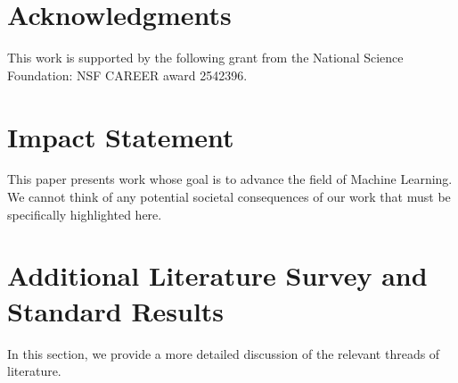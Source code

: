 \documentclass{article}
\begin{document}

\section*{Acknowledgments}
This work is supported by the following grant from the National Science Foundation: NSF CAREER award 2542396. 

\section*{Impact Statement}
This paper presents work whose goal is to advance the field of Machine Learning. We cannot think of any potential societal consequences of our work that must be specifically highlighted here. 


\appendix


\newpage
\onecolumn
\section{Additional Literature Survey and Standard Results}
\label{app:Litsurv}
In this section, we provide a more detailed discussion of the relevant threads of literature.
\end{document}
